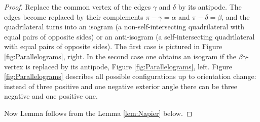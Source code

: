 \documentclass{amsart}
\theoremstyle{definition}
\begin{document}
\begin{proof}
Replace the common vertex of the edges $\gamma$ and $\delta$ by its antipode.
The edges become replaced by their complements $\pi-\gamma = \alpha$ and $\pi-\delta = \beta$, and the quadrilateral turns into an isogram (a non-self-intersecting quadrilateral with equal pairs of opposite sides) or an anti-isogram (a self-intersecting quadrilateral with equal pairs of opposite sides).
The first case is pictured in Figure \ref{fig:Parallelograms}, right.
In the second case one obtains an isogram if the $\beta\gamma$-vertex is replaced by its antipode, Figure \ref{fig:Parallelograms}, left.
Figure \ref{fig:Parallelograms} describes all possible configurations up to orientation change: instead of three positive and one negative exterior angle there can be three negative and one positive one.

Now Lemma follows from the Lemma \ref{lem:Napier} below.


\end{proof}
\end{document}
